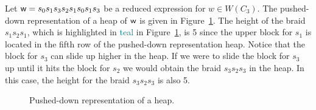 \begin{example}
Let $\mathsf{w}=s_0s_1s_3s_2s_1s_0s_1s_3$ be a reduced expression for $w \in W(C_3)$. The pushed-down representation of a heap of $\mathsf{w}$ is given in Figure~\ref{fig:pusheddownheap}. The height of the braid $s_1s_2s_1$, which is highlighted in \textcolor{teal}{teal} in Figure~\ref{fig:pusheddownheap}, is 5 since the upper block for $s_1$ is located in the fifth row of the pushed-down representation heap. Notice that the block for $s_3$ can slide up higher in the heap. If we were to slide the block for $s_3$ up until it hits the block for $s_2$ we would obtain the braid $s_3s_2s_3$ in the heap. In this case, the height for the braid $s_3s_2s_3$ is also 5.   

\begin{figure}[h!] \centering
{}	
\caption{Pushed-down representation of a heap.}\label{fig:pusheddownheap}
\end{figure}

	
\end{example}


